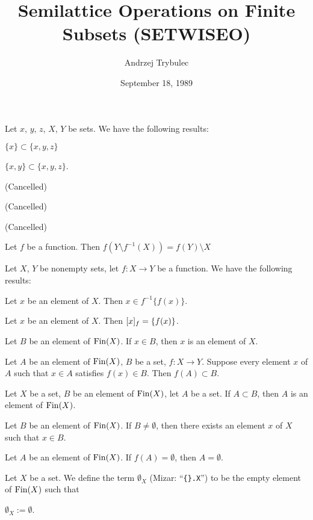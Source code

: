 \documentclass{article}
\title{Semilattice Operations on Finite Subsets (SETWISEO)}
\author{Andrzej Trybulec}
\date{September 18, 1989}
\begin{document}
\maketitle

Let $x$, $y$, $z$, $X$, $Y$ be sets. We have the following results:
\begin{thm}
\item\label{setwiseo:1} $\{x\}\subset\{x,y,z\}$
\item\label{setwiseo:2} $\{x,y\}\subset\{x,y,z\}$.
\item\label{setwiseo:3} (Cancelled)
\item\label{setwiseo:4} (Cancelled)
\item\label{setwiseo:5} (Cancelled)
\item\label{setwiseo:6} Let $f$ be a function. Then $f(Y\setminus f^{-1}(X))=f(Y)\setminus X$
\end{thm}

Let $X$, $Y$ be nonempty sets, let $f\colon X\to Y$ be a function. We
have the following results:
\begin{thm}
\item\label{setwiseo:7} Let $x$ be an element of $X$. Then $x\in f^{-1}\{f(x)\}$.
\item\label{setwiseo:8} Let $x$ be an element of $X$. Then $\RelIm{f}{x}=\{f(x)\}$.
\item\label{setwiseo:9} Let $B$ be an element of $\Fin(X)$.
  If $x\in B$, then $x$ is an element of $X$.
\item\label{setwiseo:10} Let $A$ be an element of $\Fin(X)$, $B$ be a
  set, $f\colon X\to Y$. Suppose every element $x$ of $A$ such that
  $x\in A$ satisfies $f(x)\in B$.
  Then $f(A)\subset B$.
\item\label{setwiseo:11} Let $X$ be a set, $B$ be an element of $\Fin(X)$,
  let $A$ be a set. If $A\subset B$, then $A$ is an element of $\Fin(X)$.
\item\label{setwiseo:12} Let $B$ be an element of $\Fin(X)$. If
  $B\neq\emptyset$, then there exists an element $x$ of $X$ such that
  $x\in B$.
\item\label{setwiseo:13} Let $A$ be an element of $\Fin(X)$. If
  $f(A)=\emptyset$, then $A=\emptyset$.
\end{thm}

\begin{definition}
Let $X$ be a set.
We define the term $\emptyset_{X}$ (Mizar: ``\verb#{}.X#'') to be the
empty element of $\Fin(X)$ such that
\begin{defn}
\item $\emptyset_{X}:=\emptyset$.
\end{defn}
\end{definition}
\end{document}
